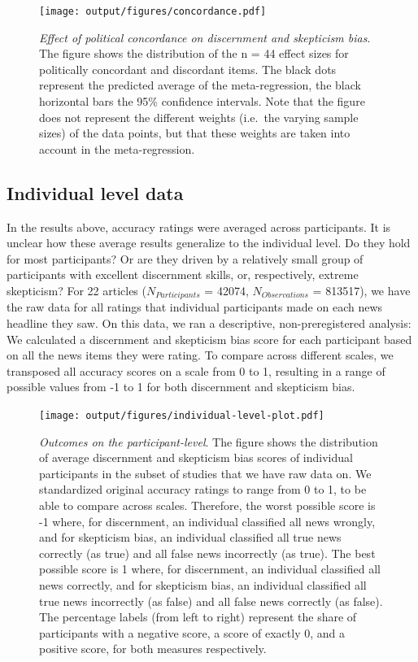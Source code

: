 \documentclass[
  man]{apa6}
\begin{document}
\begin{figure}
\centering
\texttt{[image: output/figures/concordance.pdf]}
\caption{\label{fig:concordance}\emph{Effect of political concordance on discernment and skepticism bias}. The figure shows the distribution of the n = 44 effect sizes for politically concordant and discordant items. The black dots represent the predicted average of the meta-regression, the black horizontal bars the 95\% confidence intervals. Note that the figure does not represent the different weights (i.e.~the varying sample sizes) of the data points, but that these weights are taken into account in the meta-regression.}
\end{figure}

\subsection{Individual level data}\label{individual-level-data}

In the results above, accuracy ratings were averaged across participants. It is unclear how these average results generalize to the individual level. Do they hold for most participants? Or are they driven by a relatively small group of participants with excellent discernment skills, or, respectively, extreme skepticism? For 22 articles (\(N_{Participants}\) = 42074, \(N_{Observations}\) = 813517), we have the raw data for all ratings that individual participants made on each news headline they saw. On this data, we ran a descriptive, non-preregistered analysis: We calculated a discernment and skepticism bias score for each participant based on all the news items they were rating. To compare across different scales, we transposed all accuracy scores on a scale from 0 to 1, resulting in a range of possible values from -1 to 1 for both discernment and skepticism bias.



\begin{figure}
\centering
\texttt{[image: output/figures/individual-level-plot.pdf]}
\caption{\label{fig:individual-level-plot}\emph{Outcomes on the participant-level}. The figure shows the distribution of average discernment and skepticism bias scores of individual participants in the subset of studies that we have raw data on. We standardized original accuracy ratings to range from 0 to 1, to be able to compare across scales. Therefore, the worst possible score is -1 where, for discernment, an individual classified all news wrongly, and for skepticism bias, an individual classified all true news correctly (as true) and all false news incorrectly (as true). The best possible score is 1 where, for discernment, an individual classified all news correctly, and for skepticism bias, an individual classified all true news incorrectly (as false) and all false news correctly (as false). The percentage labels (from left to right) represent the share of participants with a negative score, a score of exactly 0, and a positive score, for both measures respectively.}
\end{figure}
\end{document}
